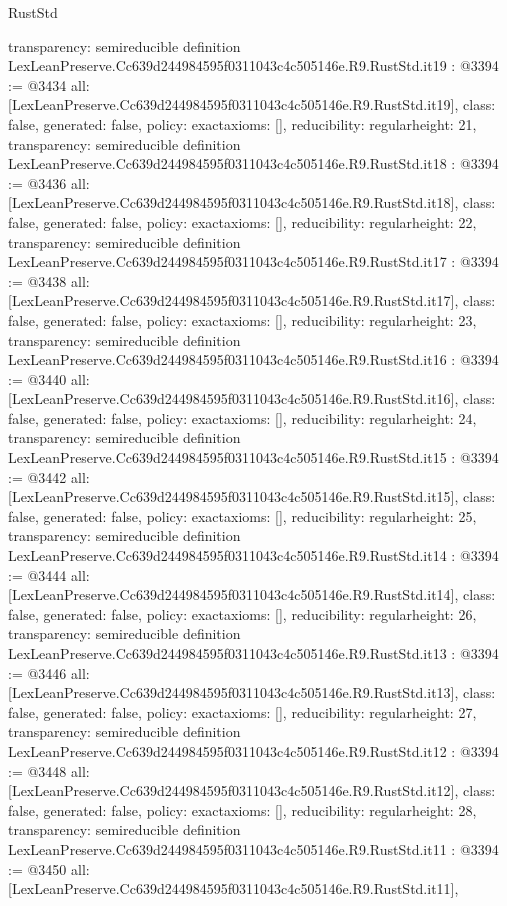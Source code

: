 \begin{lexlean}{RustStd}
\begin{coremodule}
{  transparency: semireducible
}
definition LexLeanPreserve.Cc639d244984595f0311043c4c505146e.R9.RustStd.it19 : @3394 := @3434 {
  all: [LexLeanPreserve.Cc639d244984595f0311043c4c505146e.R9.RustStd.it19],
  class: false,
  generated: false,
  policy: exact{axioms: []},
  reducibility: regular{height: 21},
  transparency: semireducible
}
definition LexLeanPreserve.Cc639d244984595f0311043c4c505146e.R9.RustStd.it18 : @3394 := @3436 {
  all: [LexLeanPreserve.Cc639d244984595f0311043c4c505146e.R9.RustStd.it18],
  class: false,
  generated: false,
  policy: exact{axioms: []},
  reducibility: regular{height: 22},
  transparency: semireducible
}
definition LexLeanPreserve.Cc639d244984595f0311043c4c505146e.R9.RustStd.it17 : @3394 := @3438 {
  all: [LexLeanPreserve.Cc639d244984595f0311043c4c505146e.R9.RustStd.it17],
  class: false,
  generated: false,
  policy: exact{axioms: []},
  reducibility: regular{height: 23},
  transparency: semireducible
}
definition LexLeanPreserve.Cc639d244984595f0311043c4c505146e.R9.RustStd.it16 : @3394 := @3440 {
  all: [LexLeanPreserve.Cc639d244984595f0311043c4c505146e.R9.RustStd.it16],
  class: false,
  generated: false,
  policy: exact{axioms: []},
  reducibility: regular{height: 24},
  transparency: semireducible
}
definition LexLeanPreserve.Cc639d244984595f0311043c4c505146e.R9.RustStd.it15 : @3394 := @3442 {
  all: [LexLeanPreserve.Cc639d244984595f0311043c4c505146e.R9.RustStd.it15],
  class: false,
  generated: false,
  policy: exact{axioms: []},
  reducibility: regular{height: 25},
  transparency: semireducible
}
definition LexLeanPreserve.Cc639d244984595f0311043c4c505146e.R9.RustStd.it14 : @3394 := @3444 {
  all: [LexLeanPreserve.Cc639d244984595f0311043c4c505146e.R9.RustStd.it14],
  class: false,
  generated: false,
  policy: exact{axioms: []},
  reducibility: regular{height: 26},
  transparency: semireducible
}
definition LexLeanPreserve.Cc639d244984595f0311043c4c505146e.R9.RustStd.it13 : @3394 := @3446 {
  all: [LexLeanPreserve.Cc639d244984595f0311043c4c505146e.R9.RustStd.it13],
  class: false,
  generated: false,
  policy: exact{axioms: []},
  reducibility: regular{height: 27},
  transparency: semireducible
}
definition LexLeanPreserve.Cc639d244984595f0311043c4c505146e.R9.RustStd.it12 : @3394 := @3448 {
  all: [LexLeanPreserve.Cc639d244984595f0311043c4c505146e.R9.RustStd.it12],
  class: false,
  generated: false,
  policy: exact{axioms: []},
  reducibility: regular{height: 28},
  transparency: semireducible
}
definition LexLeanPreserve.Cc639d244984595f0311043c4c505146e.R9.RustStd.it11 : @3394 := @3450 {
  all: [LexLeanPreserve.Cc639d244984595f0311043c4c505146e.R9.RustStd.it11],
}
\end{coremodule}
\end{lexlean}
